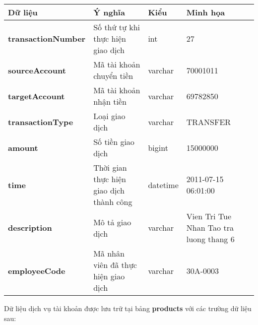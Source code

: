 \begin{center}
    \begin{tabular}{ | m{9em} | m{15em}| m{5em} | m{5em} | } 
    \hline
    \rowcolor{gray!30}
    Dữ liệu & Ý nghĩa & Kiểu & Minh họa \\ 

    \hline
    \textbf{transactionNumber} &
    Số thứ tự khi thực hiện giao dịch &
    int &
    27 \\

    \hline
    \textbf{sourceAccount} &
    Mã tài khoản chuyển tiền &
    varchar &
    70001011 \\

    \hline
    \textbf{targetAccount} &
    Mã tài khoản nhận tiền &
    varchar &
    69782850 \\

    \hline
    \textbf{transactionType} &
    Loại giao dịch &
    varchar &
    TRANSFER \\

    \hline
    \textbf{amount} &
    Số tiền giao dịch &
    bigint &
    15000000 \\

    \hline
    \textbf{time} &
    Thời gian thực hiện giao dịch thành công &
    datetime &
    2011-07-15 06:01:00 \\

    \hline
    \textbf{description} &
    Mô tả giao dịch &
    varchar &
    Vien Tri Tue Nhan Tao tra luong thang 6 \\

    \hline
    \textbf{employeeCode} &
    Mã nhân viên đã thực hiện giao dịch &
    varchar &
    30A-0003 \\

    
    \hline
    \end{tabular}
\end{center}

\noindent
Dữ liệu dịch vụ tài khoản được lưu trữ tại bảng \textbf{products} với các trường dữ liệu sau:

\renewcommand{\arraystretch}{2} %
\setlength{\tabcolsep}{10pt}

